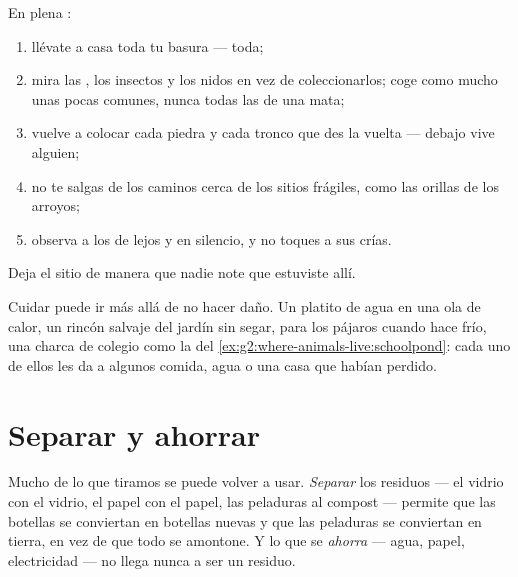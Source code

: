 \begin{method}\label{met:g2:caring-for-nature:rules}
En plena :
\begin{enumerate}
  \item llévate a casa toda tu basura --- toda;
  \item mira las , los insectos y los nidos en vez de
        coleccionarlos; coge como mucho unas pocas  comunes,
        nunca todas las de una mata;
  \item vuelve a colocar cada piedra y cada tronco que des la vuelta
        --- debajo vive alguien;
  \item no te salgas de los caminos cerca de los sitios frágiles, como
        las orillas de los arroyos;
  \item observa a los  de lejos y en silencio, y no toques a
        sus crías.
\end{enumerate}
Deja el sitio de manera que nadie note que estuviste allí.
\end{method}

\begin{example}\label{ex:g2:caring-for-nature:help}
Cuidar puede ir más allá de no hacer daño. Un platito de agua en una
ola de calor, un rincón salvaje del jardín sin segar,  para
los pájaros cuando hace frío, una charca de colegio como la del
\cref{ex:g2:where-animals-live:schoolpond}: cada uno de ellos les da a
algunos  comida, agua o una casa que habían perdido.
\end{example}

\section{Separar y ahorrar}

\begin{proposition}\label{prop:g2:caring-for-nature:recycle}
Mucho de lo que tiramos se puede volver a usar.
\emph{Separar} los residuos --- el
vidrio con el vidrio, el papel con el papel, las peladuras al compost
--- permite que las botellas se conviertan en botellas nuevas y que
las peladuras se conviertan en tierra, en vez de que todo se amontone.
Y lo que se \emph{ahorra} --- agua, papel, electricidad --- no llega
nunca a ser un residuo.
\end{proposition}
\admitted

